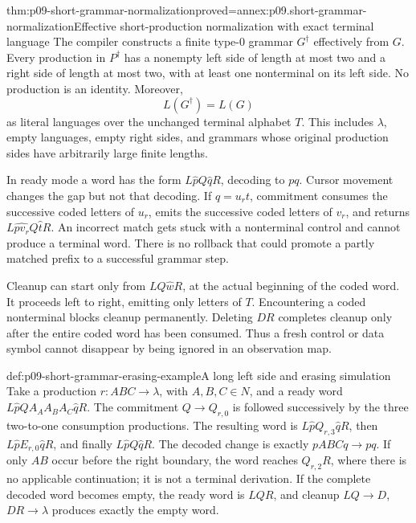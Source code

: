 \begin{hbtheorem}{thm:p09-short-grammar-normalization}{proved=annex:p09.short-grammar-normalization}{Effective short-production normalization with exact terminal language}
The compiler constructs a finite type-0 grammar \(G^\dagger\) effectively
from \(G\). Every production in \(P^\dagger\) has a nonempty left side
of length at most two and a right side of length at most two, with at least
one nonterminal on its left side. No production is an identity.
Moreover,
\[
 L(G^\dagger)=L(G)
\]
as literal languages over the unchanged terminal alphabet \(T\).
This includes \(\lambda\), empty languages, empty right sides, and
grammars whose original production sides have arbitrarily large finite
lengths.
\end{hbtheorem}

In ready mode a word has the form
\(L\widehat pQ\widehat qR\), decoding to \(pq\).
Cursor movement changes the gap but not that decoding.
If \(q=u_rt\), commitment consumes the successive coded letters of
\(u_r\), emits the successive coded letters of \(v_r\), and returns
\(L\widehat{pv_r}Q\widehat tR\).
An incorrect match gets stuck with a nonterminal control and cannot
produce a terminal word. There is no rollback that could promote a partly
matched prefix to a successful grammar step.

Cleanup can start only from \(LQ\widehat wR\), at the actual beginning
of the coded word. It proceeds left to right, emitting only letters of
\(T\). Encountering a coded nonterminal blocks cleanup permanently.
Deleting \(DR\) completes cleanup only after the entire coded word has
been consumed. Thus a fresh control or data symbol cannot disappear by
being ignored in an observation map.

\begin{hbexample}{def:p09-short-grammar-erasing-example}{A long left side and erasing simulation}
Take a production \(r:ABC\to\lambda\), with \(A,B,C\in N\), and
a ready word \(L\widehat pQA_AA_BA_C\widehat qR\).
The commitment \(Q\to Q_{r,0}\) is followed successively by the three
two-to-one consumption productions. The resulting word is
\(L\widehat pQ_{r,3}\widehat qR\), then
\(L\widehat pE_{r,0}\widehat qR\), and finally
\(L\widehat pQ\widehat qR\).
The decoded change is exactly \(pABCq\to pq\).
If only \(AB\) occur before the right boundary, the word reaches
\(Q_{r,2}R\), where there is no applicable continuation; it is not a
terminal derivation. If the complete decoded word becomes empty, the ready
word is \(LQR\), and cleanup \(LQ\to D\), \(DR\to\lambda\)
produces exactly the empty word.
\end{hbexample}

